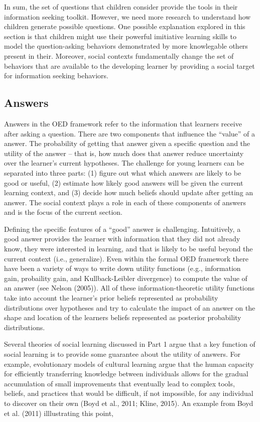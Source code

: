 \documentclass[english,floatsintext,man]{apa6}
\theoremstyle{definition}
\theoremstyle{definition}
\theoremstyle{definition}
\theoremstyle{remark}
\begin{document}
In sum, the set of questions that children consider provide the tools in
their information seeking toolkit. However, we need more research to
understand how children generate possible questions. One possible
explanation explored in this section is that children might use their
powerful imitiative learning skills to model the question-asking
behaviors demonstrated by more knowlegable others present in their.
Moreover, social contexts fundamentally change the set of behaviors that
are available to the developing learner by providing a social target for
information seeking behaviors.

\subsection{Answers}\label{answers}

Answers in the OED framework refer to the information that learners
receive after asking a question. There are two components that influence
the \enquote{value} of a answer. The probability of getting that answer
given a specific question and the utility of the answer -- that is, how
much does that answer reduce uncertainty over the learner's current
hypotheses. The challenge for young learners can be separated into three
parts: (1) figure out what which answers are likely to be good or
useful, (2) estimate how likely good answers will be given the current
learning context, and (3) decide how much beliefs should update after
getting an answer. The social context plays a role in each of these
components of answers and is the focus of the current section.

Defining the specific features of a \enquote{good} answer is
challenging. Intuitively, a good answer provides the learner with
information that they did not already know, they were interested in
learning, and that is likely to be useful beyond the current context
(i.e., generalize). Even within the formal OED framework there have been
a variety of ways to write down utility functions (e.g., information
gain, probaility gain, and Kullback-Leibler divergence) to compute the
value of an answer (see Nelson (2005)). All of these
information-theoretic utility functions take into account the learner's
prior beliefs represented as probability distributions over hypotheses
and try to calculate the impact of an answer on the shape and location
of the learners beliefs represented as posterior probability
distributions.

Several theories of social learning discussed in Part 1 argue that a key
function of social learning is to provide some guarantee about the
utility of answers. For example, evolutionary models of cultural
learning argue that the human capacity for efficiently transferring
knowledge between individuals allows for the gradual accumulation of
small improvements that eventually lead to complex tools, beliefs, and
practices that would be difficult, if not impossible, for any individual
to discover on their own (Boyd et al., 2011; Kline, 2015). An example
from Boyd et al. (2011) illlustrating this point,
\end{document}
